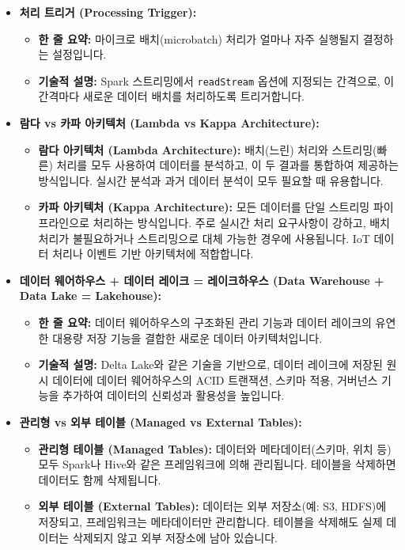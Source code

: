 \documentclass[11pt,a4paper]{article}
\theoremstyle{definition}
\begin{document}
\begin{itemize}
\begin{itemize}
    \end{itemize}
    \item \textbf{처리 트리거 (Processing Trigger):}
    \begin{itemize}
        \item \textbf{한 줄 요약:} 마이크로 배치(microbatch) 처리가 얼마나 자주 실행될지 결정하는 설정입니다.
        \item \textbf{기술적 설명:} Spark 스트리밍에서 \texttt{readStream} 옵션에 지정되는 간격으로, 이 간격마다 새로운 데이터 배치를 처리하도록 트리거합니다.
    \end{itemize}
    \item \textbf{람다 vs 카파 아키텍처 (Lambda vs Kappa Architecture):}
    \begin{itemize}
        \item \textbf{람다 아키텍처 (Lambda Architecture):} 배치(느린) 처리와 스트리밍(빠른) 처리를 모두 사용하여 데이터를 분석하고, 이 두 결과를 통합하여 제공하는 방식입니다. 실시간 분석과 과거 데이터 분석이 모두 필요할 때 유용합니다.
        \item \textbf{카파 아키텍처 (Kappa Architecture):} 모든 데이터를 단일 스트리밍 파이프라인으로 처리하는 방식입니다. 주로 실시간 처리 요구사항이 강하고, 배치 처리가 불필요하거나 스트리밍으로 대체 가능한 경우에 사용됩니다. IoT 데이터 처리나 이벤트 기반 아키텍처에 적합합니다.
    \end{itemize}
    \item \textbf{데이터 웨어하우스 + 데이터 레이크 = 레이크하우스 (Data Warehouse + Data Lake = Lakehouse):}
    \begin{itemize}
        \item \textbf{한 줄 요약:} 데이터 웨어하우스의 구조화된 관리 기능과 데이터 레이크의 유연한 대용량 저장 기능을 결합한 새로운 데이터 아키텍처입니다.
        \item \textbf{기술적 설명:} Delta Lake와 같은 기술을 기반으로, 데이터 레이크에 저장된 원시 데이터에 데이터 웨어하우스의 ACID 트랜잭션, 스키마 적용, 거버넌스 기능을 추가하여 데이터의 신뢰성과 활용성을 높입니다.
    \end{itemize}
    \item \textbf{관리형 vs 외부 테이블 (Managed vs External Tables):}
    \begin{itemize}
        \item \textbf{관리형 테이블 (Managed Tables):} 데이터와 메타데이터(스키마, 위치 등) 모두 Spark나 Hive와 같은 프레임워크에 의해 관리됩니다. 테이블을 삭제하면 데이터도 함께 삭제됩니다.
        \item \textbf{외부 테이블 (External Tables):} 데이터는 외부 저장소(예: S3, HDFS)에 저장되고, 프레임워크는 메타데이터만 관리합니다. 테이블을 삭제해도 실제 데이터는 삭제되지 않고 외부 저장소에 남아 있습니다.

\end{itemize}
\end{itemize}
\end{document}
